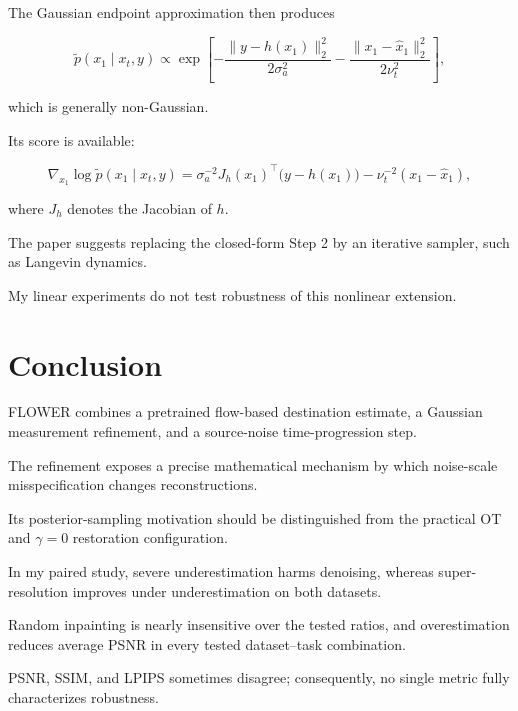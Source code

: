 \documentclass[11pt,a4paper]{article}
\newcommand{\sa}{\sigma_a}
\begin{document}
The Gaussian endpoint approximation then produces

\begin{equation}
    \widetilde p(x_1\mid x_t,y)
    \propto
    \exp\left[
        -
        \frac{\|y-h(x_1)\|_2^2}{2\sa^2}
        -
        \frac{\|x_1-\widehat x_1\|_2^2}{2\nu_t^2}
    \right],
    \label{eq:nonlineardensity}
\end{equation}

which is generally non-Gaussian.

Its score is available:

\begin{equation}
    \nabla_{x_1}
    \log
    \widetilde p(x_1\mid x_t,y)
    =
    \sa^{-2}
    J_h(x_1)^\top
    \bigl(y-h(x_1)\bigr)
    -
    \nu_t^{-2}
    (x_1-\widehat x_1),
    \label{eq:nonlinearscore}
\end{equation}

where $J_h$ denotes the Jacobian of $h$.

The paper suggests replacing the closed-form Step 2 by an iterative
sampler, such as Langevin dynamics.

My linear experiments do not test robustness of this nonlinear extension.



\section{Conclusion}

FLOWER combines a pretrained flow-based destination estimate,
a Gaussian measurement refinement, and a source-noise time-progression
step.

The refinement exposes a precise mathematical mechanism by which
noise-scale misspecification changes reconstructions.

Its posterior-sampling motivation should be distinguished from the
practical OT and $\gamma=0$ restoration configuration.

In my paired study, severe underestimation harms denoising,
whereas super-resolution improves under underestimation on both datasets.

Random inpainting is nearly insensitive over the tested ratios,
and overestimation reduces average PSNR in every tested
dataset--task combination.

PSNR, SSIM, and LPIPS sometimes disagree;
consequently, no single metric fully characterizes robustness.
\end{document}

